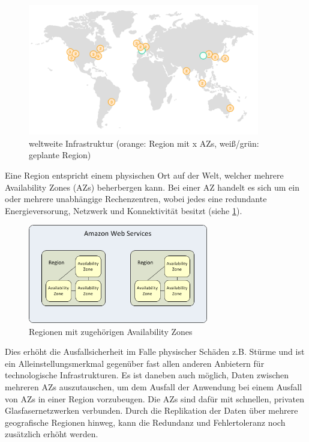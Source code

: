 {\begin{figure}[!ht]
  \centering
  \includegraphics[width=0.9\textwidth]{images/regions.png}
  \caption{weltweite Infrastruktur (orange: Region mit x AZs, weiß/grün: geplante Region) \cite{aws:regions}}
\end{figure}

Eine Region entspricht einem physischen Ort auf der Welt, welcher mehrere Availability Zones (AZs) beherbergen kann. Bei einer AZ handelt es sich um ein oder mehrere unabhängige Rechenzentren, wobei jedes eine redundante Energieversorung, Netzwerk und Konnektivität besitzt (siehe \ref{figure:azs-regions}).

\begin{figure}[!ht]
  \centering
  \includegraphics[width=0.7\textwidth]{images/azs_regions.png}
  \caption{Regionen mit zugehörigen Availability Zones \cite{aws:azs}}\label{figure:azs-regions}
\end{figure}

Dies erhöht die Ausfallsicherheit im Falle physischer Schäden z.B. Stürme und ist ein Alleinstellungsmerkmal gegenüber fast allen anderen Anbietern für technologische Infrastrukturen. Es ist daneben auch möglich, Daten zwischen mehreren AZs auszutauschen, um dem Ausfall der Anwendung bei einem Ausfall von AZs in einer Region vorzubeugen. Die AZs sind dafür mit schnellen, privaten Glasfasernetzwerken verbunden.
Durch die Replikation der Daten über mehrere geografische Regionen hinweg, kann die Redundanz und Fehlertoleranz noch zusätzlich erhöht werden.

}
